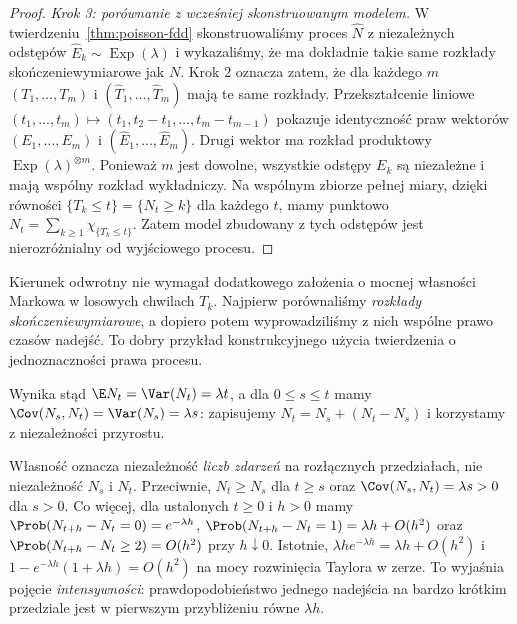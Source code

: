 \begin{proof}
\emph{Krok 3: porównanie z wcześniej skonstruowanym modelem.}
W twierdzeniu~\ref{thm:poisson-fdd} skonstruowaliśmy
proces $\widehat N$ z niezależnych odstępów
$\widehat E_k\sim\operatorname{Exp}(\lambda)$ i wykazaliśmy,
że ma dokładnie takie same rozkłady skończeniewymiarowe jak $N$.
Krok 2 oznacza zatem, że dla każdego $m$
$(T_1,\ldots,T_m)$ i $(\widehat T_1,\ldots,\widehat T_m)$
mają te same rozkłady. Przekształcenie liniowe
$(t_1,\ldots,t_m)\mapsto(t_1,t_2-t_1,\ldots,t_m-t_{m-1})$
pokazuje identyczność praw wektorów
$(E_1,\ldots,E_m)$ i $(\widehat E_1,\ldots,\widehat E_m)$.
Drugi wektor ma rozkład produktowy
$\operatorname{Exp}(\lambda)^{\otimes m}$.
Ponieważ $m$ jest dowolne, wszystkie odstępy $E_k$
są niezależne i mają wspólny rozkład wykładniczy.
Na wspólnym zbiorze pełnej miary, dzięki równości
$\{T_k\le t\}=\{N_t\ge k\}$ dla każdego $t$,
mamy punktowo $N_t=\sum_{k\ge1}\chi_{\{T_k\le t\}}$.
Zatem model zbudowany z tych odstępów jest
nierozróżnialny od wyjściowego procesu.
\end{proof}

\begin{uwaga}
Kierunek odwrotny nie wymagał dodatkowego założenia o
mocnej własności Markowa w losowych chwilach $T_k$.
Najpierw porównaliśmy \emph{rozkłady skończeniewymiarowe},
a dopiero potem wyprowadziliśmy z nich wspólne prawo
czasów nadejść. To dobry przykład konstrukcyjnego
użycia twierdzenia o jednoznaczności prawa procesu.
\end{uwaga}

Wynika stąd $\E N_t=\Var(N_t)=\lambda t$,
a dla $0\le s\le t$ mamy
$\Cov(N_s,N_t)=\Var(N_s)=\lambda s$: zapisujemy
$N_t=N_s+(N_t-N_s)$ i korzystamy z niezależności przyrostu.

\begin{uwaga}
Własność oznacza niezależność \emph{liczb zdarzeń} na rozłącznych
przedziałach, nie niezależność $N_s$ i $N_t$. Przeciwnie,
$N_t\ge N_s$ dla $t\ge s$ oraz
$\Cov(N_s,N_t)=\lambda s>0$ dla $s>0$. Co więcej, dla ustalonych
$t\ge0$ i $h>0$ mamy
$\Prob(N_{t+h}-N_t=0)=e^{-\lambda h}$,
$\Prob(N_{t+h}-N_t=1)=\lambda h+O(h^2)$
oraz $\Prob(N_{t+h}-N_t\ge2)=O(h^2)$ przy $h\downarrow0$.
Istotnie, $\lambda h e^{-\lambda h}=\lambda h+O(h^2)$
i $1-e^{-\lambda h}(1+\lambda h)=O(h^2)$
na mocy rozwinięcia Taylora w zerze.
To wyjaśnia pojęcie \emph{intensywności}: prawdopodobieństwo
jednego nadejścia na bardzo krótkim przedziale jest w pierwszym
przybliżeniu równe $\lambda h$.
\end{uwaga}

